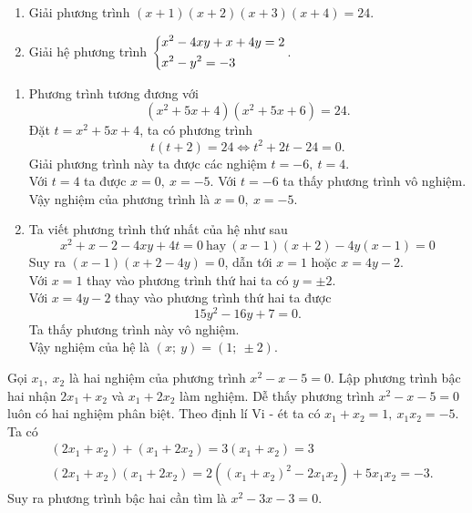 \begin{ex}%
\hfill

    \begin{enumerate}    
        \item Giải phương trình $(x+1)(x+2)(x+3)(x+4)=24.$
        \item Giải hệ phương trình $\left\{\begin{aligned}&x^2-4xy+x+4y=2\\ & x^2-y^2=-3\end{aligned}\right.$.
    \end{enumerate}
\loigiai
    {
    \begin{enumerate}
        \item Phương trình tương đương với $$(x^2+5x+4)(x^2+5x+6)=24.$$
        Đặt $t=x^2+5x+4$, ta có phương trình $$t(t+2)=24 \Leftrightarrow t^2+2t-24=0.$$ 
        Giải phương trình này ta được các nghiệm $t=-6,\ t=4$.\\ Với $t=4$ ta được $x=0,\ x=-5$. Với $t=-6$ ta thấy phương trình vô nghiệm.\\ Vậy nghiệm của phương trình là $x=0, \ x=-5.$
        \item Ta viết phương trình thứ nhất của hệ như sau  
        $$x^2+x-2-4xy+4t=0 \ \text{hay}\ (x-1)(x+2)-4y(x-1)=0$$
        Suy ra $(x-1)(x+2-4y)=0$, dẫn tới $x=1$ hoặc $x=4y-2$.\\
        Với $x=1$ thay vào phương trình thứ hai ta có $y= \pm 2$.\\
        Với $x=4y-2$ thay vào phương trình thứ hai ta được $$15y^2-16y+7=0.$$ Ta thấy phương trình này vô nghiệm.\\
        Vậy nghiệm của hệ là $(x;\ y)=(1;\ \pm 2).$
    \end{enumerate}
    }
\end{ex}

\begin{ex}%
    Gọi $x_1,\ x_2$ là hai nghiệm của phương trình $x^2-x-5=0.$ Lập phương trình bậc hai nhận $2x_1+x_2$ và $x_1+2x_2$ làm nghiệm.
\loigiai
    { Dễ thấy phương trình $x^2-x-5=0$ luôn có hai nghiệm phân biệt. Theo định lí Vi - ét ta có $x_1+x_2=1,\ x_1x_2=-5.$\\
    Ta có $$\begin{aligned} &(2x_1+x_2)+(x_1+2x_2)=3(x_1+x_2)=3 \\ & (2x_1+x_2)(x_1+2x_2)=2\left((x_1+x_2)^2-2x_1x_2 \right)+5x_1x_2=-3. \end{aligned}$$
    Suy ra phương trình bậc hai cần tìm là $x^2-3x-3=0.$
        }
\end{ex}

